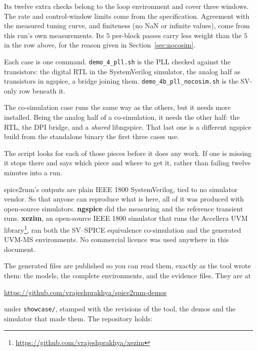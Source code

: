 \documentclass[11pt,a4paper]{article}
\begin{document}
Its twelve extra checks belong to the loop environment and cover three
windows. The rate and control-window limits come from the
specification. Agreement with the measured tuning curve, and
finiteness (no NaN or infinite values), come from this run's own
measurements. Its $5$ per-block passes carry less weight than the $5$
in the row above, for the reason given in Section~\ref{sec:nocosim}.

Each case is one command. \texttt{demo\_4\_pll.sh} is the PLL checked
against the transistors: the digital RTL in the SystemVerilog
simulator, the analog half as transistors in ngspice, a bridge joining
them. \texttt{demo\_4b\_pll\_\allowbreak nocosim.sh} is the SV-only
row beneath it.

The co-simulation case runs the same way as the others, but it needs
more installed. Being the analog half of a co-simulation, it needs the
other half: the RTL, the DPI bridge, and a \emph{shared} libngspice.
That last one is a different ngspice build from the standalone binary
the first three cases use.

The script looks for each of those pieces before it does any work. If
one is missing it stops there and says which piece and where to get
it, rather than failing twelve minutes into a run.

spice2rnm's outputs are plain IEEE 1800 SystemVerilog, tied to no
simulator vendor. So that anyone can reproduce what is here, all of it
was produced with open-source simulators. \textbf{ngspice} did the
measuring and the reference transient runs. \textbf{xezim}, an
open-source IEEE 1800 simulator that runs the Accellera UVM
library\footnote{\url{https://github.com/vrajeshprakhya/xezim}}, ran
both the SV--SPICE equivalence co-simulation and the generated UVM-MS
environments. No commercial licence was used anywhere in this
document.

The generated files are published so you can read them, exactly as
the tool wrote them: the models, the complete environments, and the
evidence files. They are at

\begin{center}
\url{https://github.com/vrajeshprakhya/spice2rnm-demos}
\end{center}

\noindent under \texttt{showcase/}, stamped with the revisions of the
tool, the demos and the simulator that made them. The repository
holds:
\end{document}
